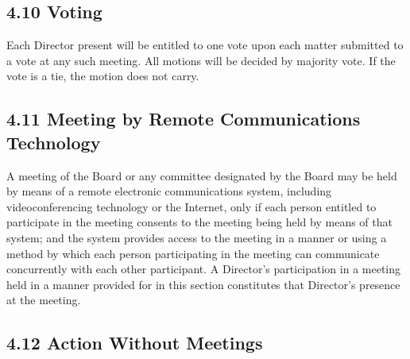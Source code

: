 \documentclass[
]{book}
\begin{document}
\subsection{4.10 Voting}\label{voting}

Each Director present will be entitled to one vote upon each matter submitted to a vote at any such meeting. All motions will be decided by majority vote. If the vote is a tie, the motion does not carry.

\subsection{4.11 Meeting by Remote Communications Technology}\label{meeting-by-remote-communications-technology}

A meeting of the Board or any committee designated by the Board may be held by means of a remote electronic communications system, including videoconferencing technology or the Internet, only if each person entitled to participate in the meeting consents to the meeting being held by means of that system; and the system provides access to the meeting in a manner or using a method by which each person participating in the meeting can communicate concurrently with each other participant. A Director's participation in a meeting held in a manner provided for in this section constitutes that Director's presence at the meeting.

\subsection{4.12 Action Without Meetings}\label{action-without-meetings}
\end{document}

